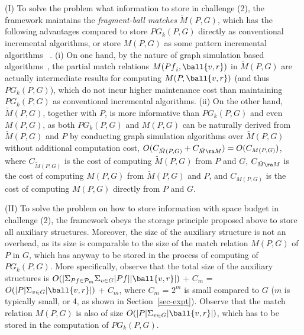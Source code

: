 \sstab (I) To solve the problem what information to store in challenge (2), the framework maintains the {\em fragment-ball matches} $\tilde{M}(P,G)$,
 which has the following advantages compared to store $PG_k(P,G)$ directly as conventional incremental algorithms, or store $M(P,G)$ as some pattern incremental algorithms ~\cite{FanWW13-tods}.
 (i) On one hand, by the nature of graph simulation based algorithms~\cite{infsimu95}, the partial match relations $M({Pf}_i, \ball{v,r})$ in $\tilde{M}(P,G)$ are actually intermediate results for computing $M(P,\ball{v,r})$ (and thus $PG_k(P,G)$), which do not incur higher maintenance cost than maintaining $PG_k(P,G)$ as conventional incremental algorithms.
(ii) On the other hand, $\tilde{M}(P,G)$, together with $P$, is more informative than $PG_k(P,G)$ and even $M(P,G)$, as both $PG_k(P,G)$ and $M(P,G)$ can be naturally derived from $\tilde{M}(P,G)$ and $P$ by conducting graph simulation algorithms over $\tilde{M}(P,G)$ without additional computation cost, \ie $O(C_{\tilde{M}(P,G)} + C_{\tilde{M}\ra M}) = O(C_{M(P,G)})$, where $C_{\tilde{M}(P,G)}$ is the cost of computing $\tilde{M}(P,G)$ from $P$ and $G$, $C_{\tilde{M}\ra M}$ is the cost of computing $M(P,G)$ from $\tilde{M}(P,G)$ and $P$, and $C_{M(P,G)}$ is the cost of computing $M(P,G)$ directly from $P$ and $G$.


\sstab (II) To solve the problem on how to store information with space budget in challenge (2), the framework obeys the storage principle proposed above to store all auxiliary structures.
Moreover, the size of the auxiliary structure is not an overhead, as its size is comparable to the size of the match relation $M(P, G)$ of $P$ in $G$, which has anyway to be stored in the process of computing of $PG_{k}(P, G)$.
More specifically, observe that the total size of the auxiliary structures is $O(|\Sigma_{Pf\in {\cal P}_{m}}\Sigma_{v\in G}|Pf||\ball{v,r}|)$ + $C_{m}$ = $O(|P|\Sigma_{v\in G}|\ball{v,r}|)$ + $C_{m}$, where $C_{m}$ = $2^{m}$ is small compared to $G$ ($m$ is typically small,  or 4, as shown in Section~\ref{sec-expt}). Observe that the match relation $M(P, G)$ is also of size $O(|P|\Sigma_{v\in G}|\ball{v, r}|)$, which has to be stored in the computation of $PG_{k}(P, G)$.




